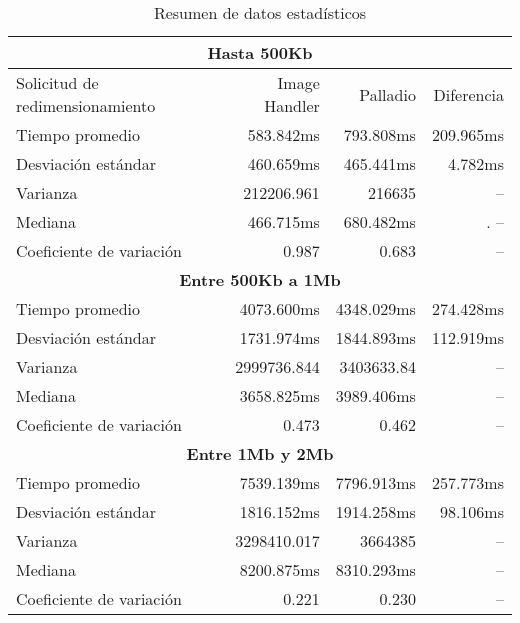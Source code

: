 \hspace{-4cm}
\begin{table}
    \centering
    \begin{tabular}{l|r|r|r}
        \toprule[1.5pt]
        \multicolumn{4}{c}{\textbf{Hasta 500Kb}} \\
        \midrule
        Solicitud de redimensionamiento  & Image Handler & Palladio & Diferencia\\
        \midrule
        Tiempo promedio  & 583.842ms & 793.808ms & 209.965ms\\
        Desviación estándar & 460.659ms & 465.441ms & 4.782ms\\
        Varianza & 212206.961 & 216635 & -- \\
        Mediana & 466.715ms & 680.482ms &. -- \\
        Coeficiente de variación & 0.987 & 0.683 & -- \\
        \toprule[1.5pt]
         \multicolumn{4}{c}{\textbf{Entre 500Kb a 1Mb}} \\
         \midrule 
        Tiempo promedio  & 4073.600ms & 4348.029ms & 274.428ms\\
        Desviación estándar & 1731.974ms & 1844.893ms & 112.919ms\\
        Varianza & 2999736.844 & 3403633.84 & --\\
        Mediana & 3658.825ms & 3989.406ms & -- \\
        Coeficiente de variación & 0.473 & 0.462 & -- \\
        \toprule[1.5pt]
         \multicolumn{4}{c}{\textbf{Entre 1Mb y 2Mb}} \\
         \midrule 
        Tiempo promedio  & 7539.139ms & 7796.913ms & 257.773ms\\
        Desviación estándar & 1816.152ms & 1914.258ms & 98.106ms \\
        Varianza & 3298410.017 & 3664385 & -- \\
        Mediana & 8200.875ms & 8310.293ms & -- \\
        Coeficiente de variación & 0.221 & 0.230 & -- \\                        
        \bottomrule[1.5pt]
    \end{tabular}
    \caption{Resumen de datos estadísticos}
\end{table}



